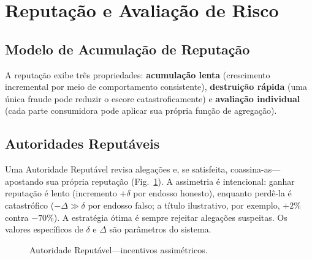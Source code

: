 \documentclass[11pt,a4paper,twocolumn]{article}
\begin{document}
\section{Reputação e Avaliação de Risco}

\subsection{Modelo de Acumulação de Reputação}

A reputação exibe três propriedades: \textbf{acumulação lenta} (crescimento incremental por meio de comportamento consistente), \textbf{destruição rápida} (uma única fraude pode reduzir o escore catastroficamente) e \textbf{avaliação individual} (cada parte consumidora pode aplicar sua própria função de agregação).

\subsection{Autoridades Reputáveis}

Uma Autoridade Reputável revisa alegações e, se satisfeita, coassina-as---apostando sua própria reputação (Fig.~\ref{fig:authority}). A assimetria é intencional: ganhar reputação é lento (incremento $+\delta$ por endosso honesto), enquanto perdê-la é catastrófico ($-\Delta \gg \delta$ por endosso falso; a título ilustrativo, por exemplo, $+2\%$ contra $-70\%$). A estratégia ótima é sempre rejeitar alegações suspeitas. Os valores específicos de $\delta$ e $\Delta$ são parâmetros do sistema.

\begin{figure}[ht]
\centering
{}
\caption{Autoridade Reputável---incentivos assimétricos.}
\label{fig:authority}
\end{figure}
\end{document}
